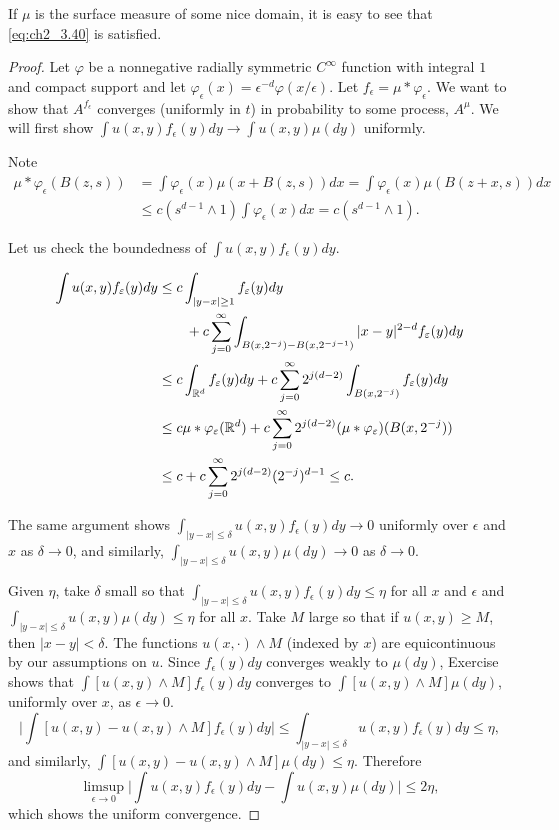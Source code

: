 If $\mu$ is the surface measure of some nice domain, it is easy to see that
\eqref{eq:ch2_3.40} is satisfied.

\begin{proof}
Let $\varphi$ be a nonnegative radially symmetric $C^\infty$ function with integral $1$ and compact support and let $\varphi_\epsilon(x) = \epsilon^{-d}\varphi(x/\epsilon)$. Let $f_\epsilon = \mu*\varphi_\epsilon$. We want to show that $A^{f_\epsilon}$ converges (uniformly in $t$) in probability to some process, $A^\mu$. We will first show $\int u(x,y)f_\epsilon(y)dy \to \int u(x,y)\mu(dy)$ uniformly.

Note
\begin{align*}
    \mu * \varphi_\epsilon(B(z,s)) &= \int \varphi_\epsilon(x)\mu(x+B(z,s))dx = \int \varphi_\epsilon(x)\mu(B(z+x,s))dx \\
    &\leq c(s^{d-1} \wedge 1) \int \varphi_\epsilon(x)dx = c(s^{d-1} \wedge 1).
\end{align*}

\mnewpage

Let us check the boundedness of $\int u(x,y)f_\epsilon(y)dy$.
\begin{adjustwidth}{0cm}{-2.62mm}
\begin{align}\label{eq:ch2_3.41}
    \int u(x,y)f_\varepsilon(y)dy &\leq c\int_{|y-x|\geq 1} f_\varepsilon(y)dy \\
    &\qquad + c\sum_{j=0}^\infty \int_{B(x,2^{-j})-B(x,2^{-j-1})} |x-y|^{2-d}f_\varepsilon(y)dy \notag \\
    &\leq c\int_{\mathbb{R}^d} f_\varepsilon(y)dy + c\sum_{j=0}^\infty 2^{j(d-2)} \int_{B(x,2^{-j})} f_\varepsilon(y)dy \notag \\
    &\leq c\mu * \varphi_\varepsilon(\mathbb{R}^d) + c\sum_{j=0}^\infty 2^{j(d-2)}(\mu * \varphi_\varepsilon)(B(x,2^{-j})) \notag \\
    &\leq c + c\sum_{j=0}^\infty 2^{j(d-2)}(2^{-j})^{d-1} \leq c. \notag
\end{align}
\end{adjustwidth}
The same argument shows $\int_{|y-x|\leq\delta} u(x,y)f_\epsilon(y)dy \to 0$ uniformly over $\epsilon$ and $x$ as $\delta \to 0$, and similarly, $\int_{|y-x|\leq\delta} u(x,y)\mu(dy) \to 0$ as $\delta \to 0$.

Given $\eta$, take $\delta$ small so that $\int_{|y-x|\leq\delta} u(x,y)f_\epsilon(y)dy \leq \eta$ for all $x$ and $\epsilon$ and $\int_{|y-x|\leq\delta} u(x,y)\mu(dy) \leq \eta$ for all $x$. Take $M$ large so that if $u(x,y) \geq M$, then $|x-y| < \delta$. The functions $u(x,\cdot) \wedge M$ (indexed by $x$) are equicontinuous by our assumptions on $u$. Since $f_\epsilon(y)dy$ converges weakly to $\mu(dy)$, Exercise  shows that $\int[u(x,y) \wedge M]f_\epsilon(y)dy$ converges to $\int[u(x,y) \wedge M]\mu(dy)$, uniformly over $x$, as $\epsilon \to 0$.
\[
    \Big|\int[u(x,y) - u(x,y) \wedge M]f_\epsilon(y)dy\Big| \leq \int_{|y-x|\leq\delta} u(x,y)f_\epsilon(y)dy \leq \eta,
\]
and similarly, $\int[u(x,y) - u(x,y) \wedge M]\mu(dy) \leq \eta$. Therefore
\[
    \limsup_{\epsilon\to 0}\Big|\int u(x,y)f_\epsilon(y)dy - \int u(x,y)\mu(dy)\Big| \leq 2\eta,
\]
which shows the uniform convergence.


\end{proof}
